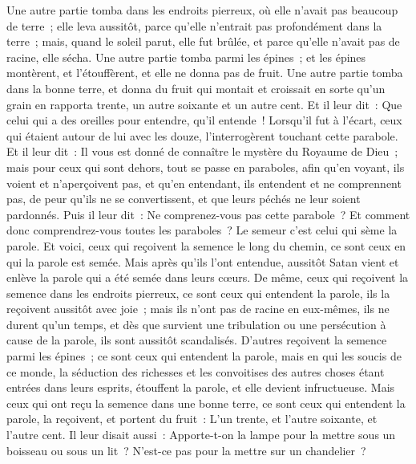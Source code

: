 \begin{multicols}{2}
Une autre partie tomba dans les endroits pierreux, où elle n'avait pas beaucoup de terre~; elle leva aussitôt, parce qu'elle n'entrait pas profondément dans la terre~;
mais, quand le soleil parut, elle fut brûlée, et parce qu'elle n'avait pas de racine, elle sécha.
Une autre partie tomba parmi les épines~; et les épines montèrent, et l'étouffèrent, et elle ne donna pas de fruit.
Une autre partie tomba dans la bonne terre, et donna du fruit qui montait et croissait en sorte qu'un grain en rapporta trente, un autre soixante et un autre cent.
Et il leur dit~: Que celui qui a des oreilles pour entendre, qu'il entende~!
Lorsqu'il fut à l'écart, ceux qui étaient autour de lui avec les douze, l'interrogèrent touchant cette parabole.
Et il leur dit~: Il vous est donné de connaître le mystère du Royaume de Dieu~; mais pour ceux qui sont dehors, tout se passe en paraboles,
afin qu'en voyant, ils voient et n'aperçoivent pas, et qu'en entendant, ils entendent et ne comprennent pas, de peur qu'ils ne se convertissent, et que leurs péchés ne leur soient pardonnés.
Puis il leur dit~: Ne comprenez-vous pas cette parabole~? Et comment donc comprendrez-vous toutes les paraboles~?
Le semeur c'est celui qui sème la parole.
Et voici, ceux qui reçoivent la semence le long du chemin, ce sont ceux en qui la parole est semée. Mais après qu'ils l'ont entendue, aussitôt Satan vient et enlève la parole qui a été semée dans leurs cœurs.
De même, ceux qui reçoivent la semence dans les endroits pierreux, ce sont ceux qui entendent la parole, ils la reçoivent aussitôt avec joie~;
mais ils n'ont pas de racine en eux-mêmes, ils ne durent qu'un temps, et dès que survient une tribulation ou une persécution à cause de la parole, ils sont aussitôt scandalisés.
D'autres reçoivent la semence parmi les épines~; ce sont ceux qui entendent la parole,
mais en qui les soucis de ce monde, la séduction des richesses et les convoitises des autres choses étant entrées dans leurs esprits, étouffent la parole, et elle devient infructueuse.
Mais ceux qui ont reçu la semence dans une bonne terre, ce sont ceux qui entendent la parole, la reçoivent, et portent du fruit~: L'un trente, et l'autre soixante, et l'autre cent.
Il leur disait aussi~: Apporte-t-on la lampe pour la mettre sous un boisseau ou sous un lit~? N'est-ce pas pour la mettre sur un chandelier~?

\end{multicols}
